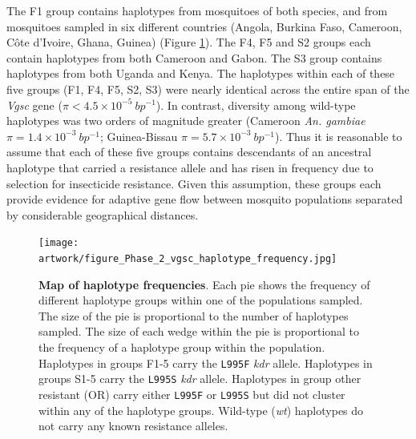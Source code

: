 \documentclass[a4paper,11pt,abstracton,hidelinks]{scrartcl}
\begin{document}
%
The F1 group contains haplotypes from mosquitoes of both species, and from mosquitoes sampled in six different countries (Angola, Burkina Faso, Cameroon, C\^{o}te d'Ivoire, Ghana, Guinea) (Figure \ref{fig:map}).
%
The F4, F5 and S2 groups each contain haplotypes from both Cameroon and Gabon.
%
The S3 group contains haplotypes from both Uganda and Kenya.
%
The haplotypes within each of these five groups (F1, F4, F5, S2, S3) were nearly identical across the entire span of the \textit{Vgsc} gene ($\pi < 4.5 \times 10^{-5}\ bp^{-1}$).
%
In contrast, diversity among wild-type haplotypes was two orders of magnitude greater (Cameroon \textit{An. gambiae} $\pi = 1.4 \times 10^{-3}\ bp^{-1}$; Guinea-Bissau $\pi = 5.7 \times 10^{-3}\ bp^{-1}$).
%
Thus it is reasonable to assume that each of these five groups contains descendants of an ancestral haplotype that carried a resistance allele and has risen in frequency due to selection for insecticide resistance.
%
Given this assumption, these groups each provide evidence for adaptive gene flow between mosquito populations separated by considerable geographical distances.
%


%
\begin{figure}[!t]
  \texttt{[image: artwork/figure\_Phase\_2\_vgsc\_haplotype\_frequency.jpg]}
  \caption{\textbf{Map of haplotype frequencies}. Each pie shows the frequency of different haplotype groups within one of the populations sampled. The size of the pie is proportional to the number of haplotypes sampled. The size of each wedge within the pie is proportional to the frequency of a haplotype group within the population. Haplotypes in groups F1-5 carry the \texttt{L995F} \textit{kdr} allele. Haplotypes in groups S1-5 carry the \texttt{L995S} \textit{kdr} allele. Haplotypes in group other resistant (OR) carry either \texttt{L995F} or \texttt{L995S} but did not cluster within any of the haplotype groups. Wild-type (\textit{wt}) haplotypes do not carry any known resistance alleles.}
  \label{fig:map}
\end{figure}
\end{document}
